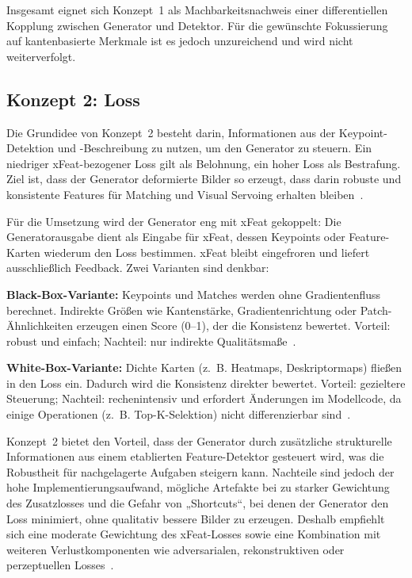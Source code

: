 Insgesamt eignet sich Konzept~1 als Machbarkeitsnachweis einer differentiellen Kopplung zwischen Generator und Detektor. 
Für die gewünschte Fokussierung auf kantenbasierte Merkmale ist es jedoch unzureichend und wird nicht weiterverfolgt.


\subsection{Konzept 2: Loss}
\label{sec:Konzept2}
Die Grundidee von Konzept~2 besteht darin, Informationen aus der Keypoint-Detektion und -Beschreibung zu nutzen, um den Generator zu steuern. 
Ein niedriger \ac{xFeat}-bezogener Loss gilt als Belohnung, ein hoher Loss als Bestrafung. 
Ziel ist, dass der Generator deformierte Bilder so erzeugt, dass darin robuste und konsistente Features für Matching und Visual Servoing erhalten bleiben~\cite{potje2024xfeat}.  

Für die Umsetzung wird der Generator eng mit \ac{xFeat} gekoppelt: 
Die Generatorausgabe dient als Eingabe für \ac{xFeat}, dessen Keypoints oder Feature-Karten wiederum den Loss bestimmen. 
\ac{xFeat} bleibt eingefroren und liefert ausschließlich Feedback. 
Zwei Varianten sind denkbar:  

\textbf{Black-Box-Variante:} Keypoints und Matches werden ohne Gradientenfluss berechnet. 
Indirekte Größen wie Kantenstärke, Gradientenrichtung oder Patch-Ähnlichkeiten erzeugen einen Score (0–1), der die Konsistenz bewertet. 
Vorteil: robust und einfach; Nachteil: nur indirekte Qualitätsmaße~\cite{szeliski2022}.  

\textbf{White-Box-Variante:} Dichte Karten (z.~B. Heatmaps, Deskriptormaps) fließen in den Loss ein. 
Dadurch wird die Konsistenz direkter bewertet. 
Vorteil: gezieltere Steuerung; Nachteil: rechenintensiv und erfordert Änderungen im Modellcode, da einige Operationen (z.~B. Top-K-Selektion) nicht differenzierbar sind~\cite{detone2018superpoint,sarlin2020superglue}.  

Konzept~2 bietet den Vorteil, dass der Generator durch zusätzliche strukturelle Informationen aus einem etablierten Feature-Detektor gesteuert wird, was die Robustheit für nachgelagerte Aufgaben steigern kann. 
Nachteile sind jedoch der hohe Implementierungsaufwand, mögliche Artefakte bei zu starker Gewichtung des Zusatzlosses und die Gefahr von „Shortcuts“, bei denen der Generator den Loss minimiert, ohne qualitativ bessere Bilder zu erzeugen. 
Deshalb empfiehlt sich eine moderate Gewichtung des \ac{xFeat}-Losses sowie eine Kombination mit weiteren Verlustkomponenten wie adversarialen, rekonstruktiven oder perzeptuellen Losses~\cite{goodfellow2014gan,isola2018Pix2Pix}.  

